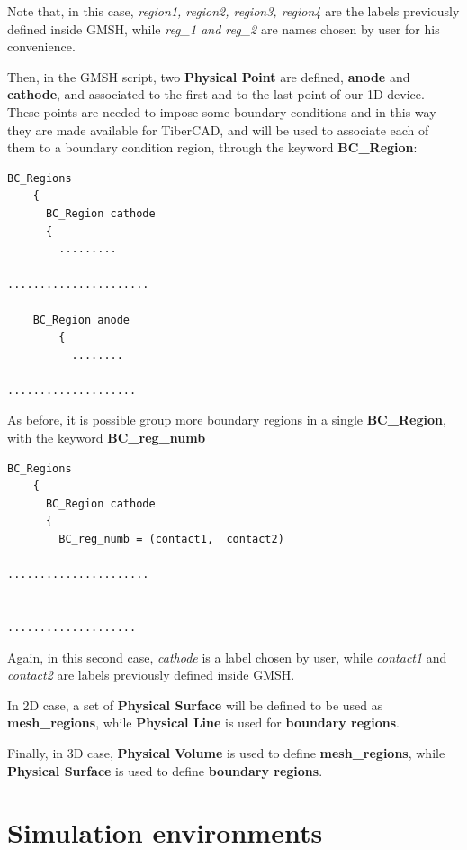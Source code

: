 Note  that, in  this case, \textit{region1, region2, region3, region4}  are  the  labels  previously  defined inside  GMSH,  while  \textit{reg\_1 and  reg\_2} are  names chosen  by  user for  his  convenience.


Then,  in  the  GMSH  script,  two  \textbf{Physical Point }  are  defined, \textbf{anode}  and \textbf{ cathode},   and  associated to  the  first  and  to  the   last  point  of  our  1D  device.  These  points  are  needed  to  impose  some  boundary  conditions   and  in this  way  they  are made  available for  TiberCAD{},  and  will be  used  to  associate each  of  them  to  a  boundary  condition  region, through the  keyword 
\textbf{BC\_Region}:

\begin{verbatim}
BC_Regions  
    {
      BC_Region cathode
      {
        .........

......................

	BC_Region anode
        {
          ........

....................

\end{verbatim}

As  before,  it  is  possible  group more  boundary regions in  a  single \textbf{BC\_Region}, with  the  keyword 
 \textbf{BC\_reg\_numb}

\begin{verbatim}
BC_Regions  
    {
      BC_Region cathode
      {
        BC_reg_numb = (contact1,  contact2)

......................

	
....................

\end{verbatim}

Again,  in  this second  case,  \textit{cathode}  is  a  label  chosen  by user,  while  \textit{contact1} and  \textit{contact2} are    labels  previously  defined inside  GMSH.


In  2D  case,  a  set  of  \textbf{Physical Surface}  will  be  defined  to  be  used  as   \textbf{mesh\_regions},  while  
\textbf{Physical Line}  is  used  for  \textbf{boundary regions}.

Finally,  in  3D  case,  \textbf{Physical Volume} is   used  to  define  \textbf{mesh\_regions},  while \textbf{Physical Surface} is  used  to  define  \textbf{boundary regions}.




\section{Simulation  environments }

